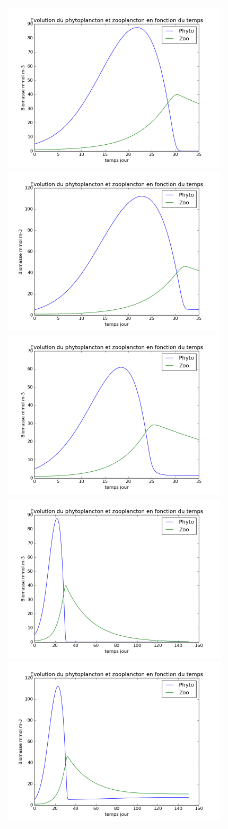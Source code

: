 {\begin{figure}[h!]
  \includegraphics[width=0.5\textwidth]{partie1/refMic35.png}\hfill
  \includegraphics[width=0.5\textwidth]{partie1/refMicSeul35.png}\\
  \includegraphics[width=0.5\textwidth]{partie1/refHol35.png}\hfill
  \includegraphics[width=0.5\textwidth]{partie1/refMic150.png}\\
  \includegraphics[width=0.5\textwidth]{partie1/refMicSeul150.png}\hfill

\end{figure}}
